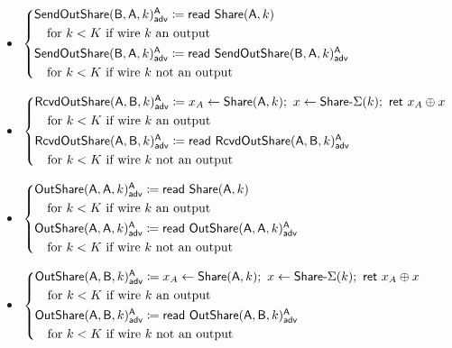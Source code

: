\begin{itemize}
\item {\color{blue} $\begin{cases*} \LeakSendOutShare(\B,\A,k)^\A_\adv \coloneqq \read{\Share(\A,k)} \\ \hspace{10pt} \text{for $k < K$ if wire $k$ an output} \\ \LeakSendOutShare(\B,\A,k)^\A_\adv \coloneqq \read{\LeakSendOutShare(\B,\A,k)^\A_\adv} \\ \hspace{10pt} \text{for $k < K$ if wire $k$ not an output} \end{cases*}$}
\item {\color{blue} $\begin{cases*} \LeakRcvdOutShare(\A,\B,k)^\A_\adv \coloneqq x_A \leftarrow \Share(\A,k); \ x \leftarrow \SumShare(k); \ \ret{x_A \oplus x} \\ \hspace{10pt} \text{for $k < K$ if wire $k$ an output} \\ \LeakRcvdOutShare(\A,\B,k)^\A_\adv \coloneqq \read{\LeakRcvdOutShare(\A,\B,k)^\A_\adv} \\ \hspace{10pt} \text{for $k < K$ if wire $k$ not an output} \end{cases*}$}
\item {\color{blue} $\begin{cases*} \LeakOutShare(\A,\A,k)^\A_\adv \coloneqq \read{\Share(\A,k)} \\ \hspace{10pt} \text{for $k < K$ if wire $k$ an output} \\ \LeakOutShare(\A,\A,k)^\A_\adv \coloneqq \read{\LeakOutShare(\A,\A,k)^\A_\adv} \\ \hspace{10pt} \text{for $k < K$ if wire $k$ not an output} \end{cases*}$}
\item {\color{blue} $\begin{cases*} \LeakOutShare(\A,\B,k)^\A_\adv \coloneqq x_A \leftarrow \Share(\A,k); \ x \leftarrow \SumShare(k); \ \ret{x_A \oplus x} \\ \hspace{10pt} \text{for $k < K$ if wire $k$ an output} \\ \LeakOutShare(\A,\B,k)^\A_\adv \coloneqq \read{\LeakOutShare(\A,\B,k)^\A_\adv} \\ \hspace{10pt} \text{for $k < K$ if wire $k$ not an output} \end{cases*}$}

\end{itemize}
